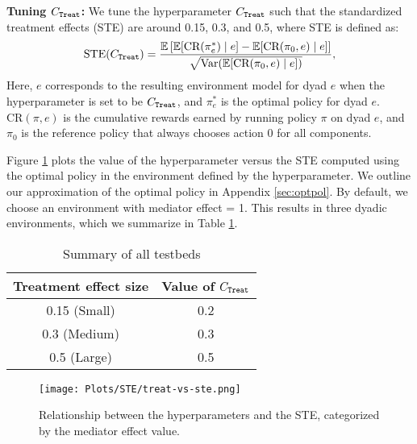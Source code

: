 \textbf{Tuning $C_{\tiny{\texttt{Treat}}}$: } We tune the hyperparameter  $C_{\tiny{\texttt{Treat}}}$ such that the standardized treatment effects (STE) are around 0.15, 0.3, and 0.5, where STE is defined as:
\begin{equation}
    \operatorname{STE}(C_{\tiny{\texttt{Treat}}}) = \frac{\mathbb{E}\left[\mathbb{E}[\text{CR}(\pi^*_{e}) \mid e] - \mathbb{E}[\text{CR}(\pi_0, e) \mid e]\right]}{\sqrt{\operatorname{Var}(\mathbb{E}[\text{CR}(\pi_0, e) \mid e])}},
    \label{equ:STE}
\end{equation}
Here, $e$ corresponds to the resulting environment model for dyad $e$ when the hyperparameter is set to be $C_{\tiny{\texttt{Treat}}}$, and $\pi_e^*$ is the optimal policy for dyad $e$. $\text{CR}(\pi, e)$ is the cumulative rewards earned by running policy $\pi$ on dyad $e$, and $\pi_0$ is the reference policy that always chooses action 0 for all components. 

Figure \ref{fig:ste} plots the value of the hyperparameter versus the STE computed using the optimal policy in the environment defined by the hyperparameter. We outline our approximation of the optimal policy in Appendix \ref{sec:optpol}. By default, we choose an environment with mediator effect = 1. This results in three dyadic environments, which we summarize in Table \ref{tab:test-bed}.

\begin{table}[ht]
    \centering
    \caption{Summary of all testbeds}
    \begin{tabular}{c|c}
     Treatment effect size & Value of $C_{\tiny{\texttt{Treat}}}$ \\
    \hline
       0.15 (Small)  & 0.2 \\
       0.3 (Medium) & 0.3 \\
       0.5 (Large) & 0.5 \\
    \end{tabular}
    \label{tab:test-bed}
\end{table}

\begin{figure}[hpt]
    \centering
    \texttt{[image: Plots/STE/treat-vs-ste.png]}
    \caption{Relationship between the hyperparameters and the STE, categorized by the mediator effect value.}
    \label{fig:ste}
\end{figure}

